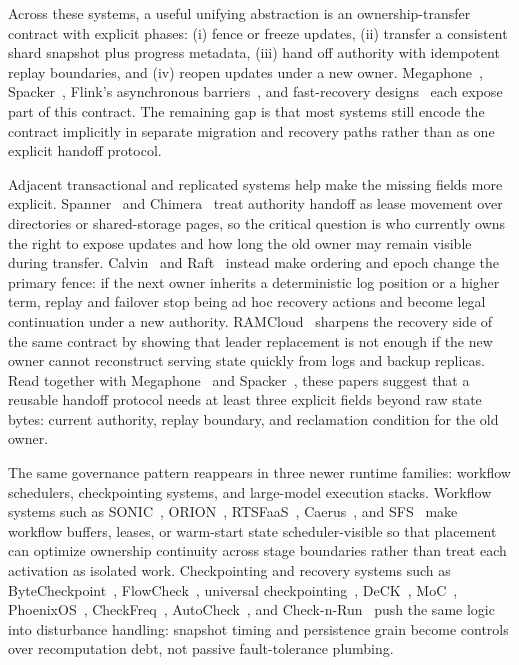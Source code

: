 \documentclass[acmsmall,screen,review]{acmart}
\begin{document}
Across these systems, a useful unifying abstraction is an ownership-transfer contract with explicit phases: (i) fence or freeze updates, (ii) transfer a consistent shard snapshot plus progress metadata, (iii) hand off authority with idempotent replay boundaries, and (iv) reopen updates under a new owner. Megaphone~\cite{nasir2019megaphone}, Spacker~\cite{mao2025spacker}, Flink's asynchronous barriers~\cite{carbone2015asynchronous}, and fast-recovery designs~\cite{zhao2024recovery} each expose part of this contract. The remaining gap is that most systems still encode the contract implicitly in separate migration and recovery paths rather than as one explicit handoff protocol.

Adjacent transactional and replicated systems help make the missing fields more explicit. Spanner~\cite{corbett2012spanner} and Chimera~\cite{huang2025chimera} treat authority handoff as lease movement over directories or shared-storage pages, so the critical question is who currently owns the right to expose updates and how long the old owner may remain visible during transfer. Calvin~\cite{thomson2012calvin} and Raft~\cite{ongaro2014raft} instead make ordering and epoch change the primary fence: if the next owner inherits a deterministic log position or a higher term, replay and failover stop being ad hoc recovery actions and become legal continuation under a new authority. RAMCloud~\cite{ousterhout2011ramcloud} sharpens the recovery side of the same contract by showing that leader replacement is not enough if the new owner cannot reconstruct serving state quickly from logs and backup replicas. Read together with Megaphone~\cite{nasir2019megaphone} and Spacker~\cite{mao2025spacker}, these papers suggest that a reusable handoff protocol needs at least three explicit fields beyond raw state bytes: current authority, replay boundary, and reclamation condition for the old owner.

The same governance pattern reappears in three newer runtime families: workflow schedulers, checkpointing systems, and large-model execution stacks. Workflow systems such as SONIC~\cite{mahgoub2021sonic}, ORION~\cite{mahgoub2022orion}, RTSFaaS~\cite{zhao2025rtsfaas}, Caerus~\cite{zhang2021caerus}, and SFS~\cite{fu2022sfs} make workflow buffers, leases, or warm-start state scheduler-visible so that placement can optimize ownership continuity across stage boundaries rather than treat each activation as isolated work. Checkpointing and recovery systems such as ByteCheckpoint~\cite{wan2025bytecheckpoint}, FlowCheck~\cite{huang2025flowcheck}, universal checkpointing~\cite{lian2025universal}, DeCK~\cite{gao2025deck}, MoC~\cite{cai2025moc}, PhoenixOS~\cite{wei2025phoenixos}, CheckFreq~\cite{mohan2021checkfreq}, AutoCheck~\cite{fu2024autocheck}, and Check-n-Run~\cite{eisenman2022checknrun} push the same logic into disturbance handling: snapshot timing and persistence grain become controls over recomputation debt, not passive fault-tolerance plumbing.
\end{document}
